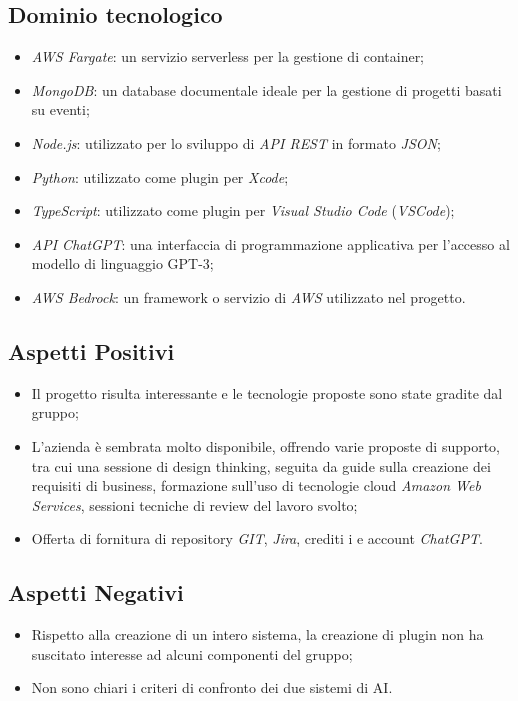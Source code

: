 \documentclass{article}
\begin{document}
\subsection{Dominio tecnologico}
\begin{itemize}
    \item \textit{AWS Fargate}: un servizio serverless per la gestione di container;
    \item \textit{MongoDB}: un database documentale ideale per la gestione di progetti basati su eventi;
    \item \textit{Node.js}: utilizzato per lo sviluppo di \textit{API REST} in formato \textit{JSON};
    \item \textit{Python}: utilizzato come plugin per \textit{Xcode};
    \item \textit{TypeScript}: utilizzato come plugin per \textit{Visual Studio Code} (\textit{VSCode});
    \item  \textit{API ChatGPT}: una interfaccia di programmazione applicativa per l'accesso al modello di linguaggio GPT-3;
    \item \textit{AWS Bedrock}: un framework o servizio di \textit{AWS} utilizzato nel progetto.
\end{itemize}


\subsection{Aspetti Positivi}
\begin{itemize}
    \item Il progetto risulta interessante e le tecnologie proposte sono state gradite dal gruppo;
    \item L’azienda è sembrata molto disponibile, offrendo varie proposte di supporto, tra cui una sessione di design thinking, seguita da guide sulla creazione dei requisiti di business, formazione sull’uso di tecnologie cloud \textit{Amazon Web Services}, sessioni tecniche di review del lavoro svolto;
    \item Offerta di fornitura di repository \textit{GIT}, \textit{Jira}, crediti i e account \textit{ChatGPT}.
\end{itemize}

\subsection{Aspetti Negativi}
\begin{itemize}
    \item Rispetto alla creazione di un intero sistema, la creazione di plugin non ha suscitato interesse ad alcuni componenti del gruppo;
    \item Non sono chiari i criteri di confronto dei due sistemi di AI.
\end{itemize}
\end{document}
